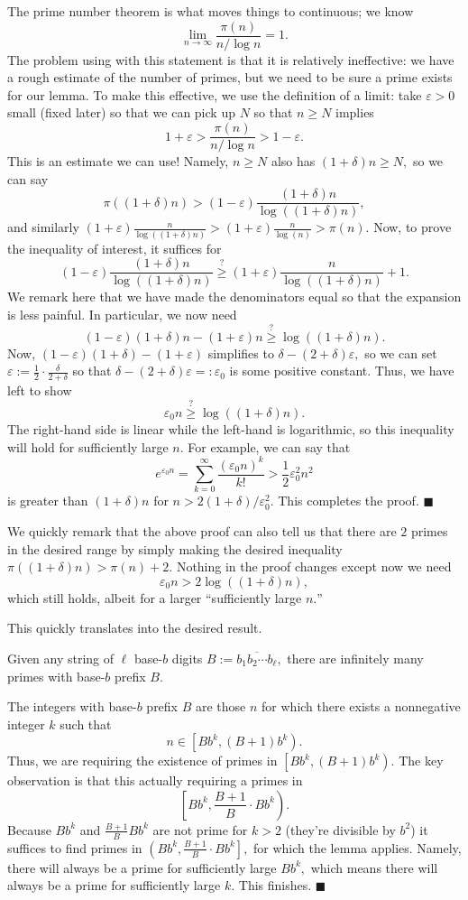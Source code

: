 The prime number theorem is what moves things to continuous; we know
\[\lim_{n\to\infty}\frac{\pi(n)}{n/\log n}=1.\]
The problem using with this statement is that it is relatively ineffective: we have a rough estimate of the number of primes, but we need to be sure a prime exists for our lemma. To make this effective, we use the definition of a limit: take $\varepsilon>0$ small (fixed later) so that we can pick up $N$ so that $n\ge N$ implies
\[1+\varepsilon>\frac{\pi(n)}{n/\log n}>1-\varepsilon.\]
This is an estimate we can use! Namely, $n\ge N$ also has $(1+\delta)n\ge N,$ so we can say
\[\pi((1+\delta)n)>(1-\varepsilon)\frac{(1+\delta)n}{\log((1+\delta)n)},\]
and similarly $(1+\varepsilon)\frac n{\log((1+\delta)n)}>(1+\varepsilon)\frac n{\log(n)}>\pi(n).$ Now, to prove the inequality of interest, it suffices for
\[(1-\varepsilon)\frac{(1+\delta)n}{\log((1+\delta)n)}\stackrel?\ge(1+\varepsilon)\frac n{\log((1+\delta)n)}+1.\]
We remark here that we have made the denominators equal so that the expansion is less painful. In particular, we now need
\[(1-\varepsilon)(1+\delta)n-(1+\varepsilon)n\stackrel?\ge\log((1+\delta)n).\]
Now, $(1-\varepsilon)(1+\delta)-(1+\varepsilon)$ simplifies to $\delta-(2+\delta)\varepsilon,$ so we can set $\varepsilon:=\frac12\cdot\frac{\delta}{2+\delta}$ so that $\delta-(2+\delta)\varepsilon=:\varepsilon_0$ is some positive constant. Thus, we have left to show
\[\varepsilon_0n\stackrel?\ge\log((1+\delta)n).\]
The right-hand side is linear while the left-hand is logarithmic, so this inequality will hold for sufficiently large $n.$ For example, we can say that
\[e^{\varepsilon_0n}=\sum_{k=0}^\infty\frac{(\varepsilon_0n)^k}{k!}>\frac12\varepsilon_0^2n^2\]
is greater than $(1+\delta)n$ for $n>2(1+\delta)/\varepsilon_0^2.$ This completes the proof. $\blacksquare$

We quickly remark that the above proof can also tell us that there are $2$ primes in the desired range by simply making the desired inequality $\pi((1+\delta)n)>\pi(n)+2.$ Nothing in the proof changes except now we need
\[\varepsilon_0n>2\log((1+\delta)n),\]
which still holds, albeit for a larger ``sufficiently large $n.$''

This quickly translates into the desired result.
\begin{proposition}
    Given any string of $\ell$ base-$b$ digits $B:=\overline{b_1b_2\cdots b_\ell},$ there are infinitely many primes with base-$b$ prefix $B.$
\end{proposition}
The integers with base-$b$ prefix $B$ are those $n$ for which there exists a nonnegative integer $k$ such that
\[n\in\left[Bb^k,(B+1)b^k\right).\]
Thus, we are requiring the existence of primes in $\left[Bb^k,(B+1)b^k\right).$ The key observation is that this actually requiring a primes in
\[\left[Bb^k,\frac{B+1}B\cdot Bb^k\right).\]
Because $Bb^k$ and $\frac{B+1}BBb^k$ are not prime for $k>2$ (they're divisible by $b^2$) it suffices to find primes in $\left(Bb^k,\frac{B+1}B\cdot Bb^k\right],$ for which the lemma applies. Namely, there will always be a prime for sufficiently large $Bb^k,$ which means there will always be a prime for sufficiently large $k.$ This finishes. $\blacksquare$


